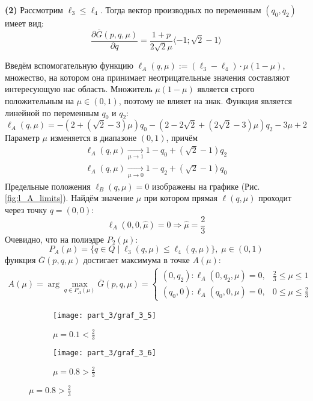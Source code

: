 
\textbf{(2)} Рассмотрим $\ell_3 \leqslant \ell_4$.
Тогда вектор производных по переменным $(q_0,q_2)$ имеет вид:	
$$
	\frac{\partial \overline{G}(p,q,\mu)}{\partial q}=
	\frac{1+p}{2\sqrt{2}\mu} \langle -1;\sqrt{2}-1 \rangle 
$$
	
Введём вспомогательную функцию	
$\ell_A(q, \mu):=(\ell_3-\ell_4) \cdot \mu(1-\mu)$,
множество, на котором она принимает неотрицательные значения 
составляют интересующую нас область. Множитель $\mu(1-\mu)$ является строго
положительным на $\mu \in (0,1)$, поэтому не влияет на знак. Функция
является линейной по переменным $q_0$ и $q_2$:	
$$
	\ell_A(q, \mu)=
	-(2+(\sqrt{2}-3)\mu)q_0
	-(2-2\sqrt{2}+(2\sqrt{2}-3)\mu)q_2
	-3\mu+2
$$ 	
Параметр $\mu$ изменяется в диапазоне $(0,1)$, причём		
\begin{gather*}	
	\ell_A(q,\mu) \xrightarrow[\mu\rightarrow 1]{} 
	1-q_0+(\sqrt{2}-1)q_2\\	
	\ell_A(q,\mu) \xrightarrow[\mu\rightarrow 0]{} 	
	1-q_2+(\sqrt{2}-1)q_0
\end{gather*}
Предельные положения $\ell_B(q, \mu)=0$ изображены на графике (Рис.
\eqref{fig:l_A_limits}). Найдём значение $\mu$ при котором прямая 
$\ell(q, \mu)$ проходит через точку $q=(0,0)$:
$$
	\ell_A(0,0,\hat \mu) = 0 \Rightarrow \hat \mu = \frac{2}{3}
$$
Очевидно, что на полиэдре $P_2(\mu):$
$$
	P_A(\mu)=\{q \in Q \; | 
	\;  \ell_3(q, \mu) \leqslant \ell_4(q, \mu) \}, \; \mu \in (0,1)
$$
функция $\overline{G}(p,q,\mu)$ достигает максимума в точке $A(\mu):$
\begin{gather*}
	A(\mu)= \arg \max \limits_{q\in P_A(\mu)} \overline G(p,q,\mu) =
	\begin{cases}
		(0, q_2) : \ell_A(0,q_2,\mu) = 
		0, & \frac{2}{3} \leqslant \mu \leqslant 1 		
		\\
		(q_0, 0) : \ell_A(q_0,0,\mu) = 
		0, & 0 \leqslant \mu \leqslant \frac{2}{3}
	\end{cases}		
\end{gather*}
\begin{figure}[H]
   	\centering
	\begin{subfigure}[b]{0.45 \textwidth}
    	\centering
		\texttt{[image: part\_3/graf\_3\_5]}
        \caption{$\mu=0.1 < \frac{2}{3}$}
         \label{fig:y equals x}
     \end{subfigure}
     \hspace{10mm}
     \begin{subfigure}[b]{0.45 \textwidth}
     	\centering
        \texttt{[image: part\_3/graf\_3\_6]}
        \caption{$\mu=0.8 > \frac{2}{3}$}
        \label{fig:three sin x}
     \end{subfigure}
\end{figure}	
	
